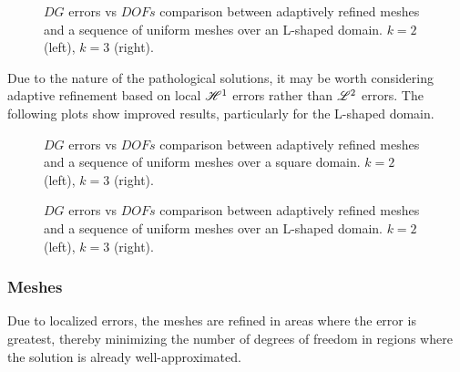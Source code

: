 \begin{figure}[!ht]
	\begin{subfigure}[b]{0.45\textwidth}
		
	\end{subfigure}
	\hfill
	\begin{subfigure}[b]{0.45\textwidth}
		
	\end{subfigure}
    \caption{$DG$ errors vs $DOFs$ comparison between adaptively refined meshes and a sequence of uniform meshes over an L-shaped domain. $k = 2$ (left), $k = 3$ (right).}
\end{figure}

\newpage

Due to the nature of the pathological solutions, it may be worth considering adaptive refinement based on local $\mathscr{H}^1$ errors rather than $\mathscr{L}^2$ errors. The following plots show improved results, particularly for the L-shaped domain.

\begin{figure}[!ht]
	\begin{subfigure}[b]{0.45\textwidth}
		
	\end{subfigure}
	\hfill
	\begin{subfigure}[b]{0.45\textwidth}
		
	\end{subfigure}
    \caption{$DG$ errors vs $DOFs$ comparison between adaptively refined meshes and a sequence of uniform meshes over a square domain. $k = 2$ (left), $k = 3$ (right).}
\end{figure}

\begin{figure}[!ht]
	\begin{subfigure}[b]{0.45\textwidth}
		
	\end{subfigure}
	\hfill
	\begin{subfigure}[b]{0.45\textwidth}
	\end{subfigure}
    \caption{$DG$ errors vs $DOFs$ comparison between adaptively refined meshes and a sequence of uniform meshes over an L-shaped domain. $k = 2$ (left), $k = 3$ (right).}
\end{figure}

\newpage
\subsubsection{Meshes}

Due to localized errors, the meshes are refined in areas where the error is greatest, thereby minimizing the number of degrees of freedom in regions where the solution is already well-approximated.

